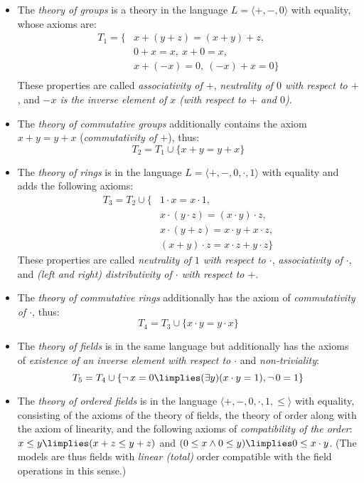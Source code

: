\begin{itemize}
    \item The \emph{theory of groups} is a theory in the language $L=\langle +,-,0\rangle$ with equality, whose axioms are:
    \begin{align*}
        T_1=\{& x + (y + z) = (x + y) + z,\\
            & 0 + x = x,\ x + 0 = x,\\
            & x + (-x) = 0,\ (-x) + x = 0\}\\
    \end{align*}
    These properties are called \emph{associativity of $+$}, \emph{neutrality of $0$ with respect to $+$}, and \emph{$-x$ is the inverse element of $x$ (with respect to $+$ and $0$)}.
    \item The \emph{theory of commutative groups} additionally contains the axiom $x+y=y+x$ (\emph{commutativity of $+$}), thus:
    $$
    T_2=T_1\cup\{x+y=y+x\}
    $$
    \item The \emph{theory of rings} is in the language $L=\langle +,-,0,\cdot,1\rangle$ with equality and adds the following axioms:
    \begin{align*}
        T_3=T_2\cup\{   & 1 \cdot x = x \cdot 1,\\
        & x \cdot (y \cdot z) = (x \cdot y) \cdot z,\\
        & x \cdot (y + z) = x \cdot y + x \cdot z,\\
        & (x + y) \cdot z = x \cdot z + y \cdot z\}
    \end{align*}
    These properties are called \emph{neutrality of $1$ with respect to $\cdot$}, \emph{associativity of $\cdot$}, and \emph{(left and right) distributivity of $\cdot$ with respect to $+$}.
    \item The \emph{theory of commutative rings} additionally has the axiom of \emph{commutativity of $\cdot$}, thus:
    $$
    T_4 = T_3 \cup \{x \cdot y = y \cdot x\}
    $$
    \item The \emph{theory of fields} is in the same language but additionally has the axioms of \emph{existence of an inverse element with respect to $\cdot$} and \emph{non-triviality}:
    $$
    T_5 = T_4 \cup \{\neg\,x=0 \limplies (\exists y)(x\cdot y = 1), \neg\,0=1\}
    $$
    \item The \emph{theory of ordered fields} is in the language $\langle +, -, 0,\cdot,1,\leq\rangle$ with equality, consisting of the axioms of the theory of fields, the theory of order along with the axiom of linearity, and the following axioms of \emph{compatibility of the order}: $x\leq y\limplies (x+z\leq y+z)$ and $(0\leq x\land 0\leq y)\limplies 0\leq x\cdot y$. (The models are thus fields with \emph{linear (total)} order compatible with the field operations in this sense.)
\end{itemize}



